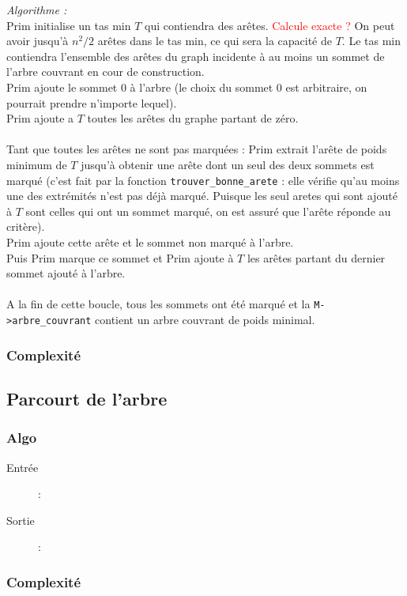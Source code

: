 \documentclass[a4paper,11pt]{article}
\begin{document}
\textit{Algorithme : } \\
Prim initialise un tas min $T$ qui contiendra des arêtes. \textcolor{red}{Calcule exacte ?} On peut avoir jusqu'à $n^2/2$ arêtes dans le tas min, ce qui sera la capacité de $T$. Le tas min contiendra l'ensemble des arêtes du graph incidente à au moins un sommet de l'arbre couvrant en cour de construction.\\
Prim ajoute le sommet 0 à l'arbre (le choix du sommet 0 est arbitraire, on pourrait prendre n'importe lequel).\\
Prim ajoute a $T$ toutes les arêtes du graphe partant de zéro.\\
\\
Tant que toutes les arêtes ne sont pas marquées : 
Prim extrait l'arête de poids minimum de $T$ jusqu'à obtenir une arête dont un seul des deux sommets est marqué (c'est fait par la fonction \texttt{trouver\_bonne\_arete} : elle vérifie qu'au moins une des extrémités n'est pas déjà marqué. Puisque les seul aretes qui sont ajouté à $T$ sont celles qui ont un sommet marqué, on est assuré que l'arête réponde au critère).\\
Prim ajoute cette arête et le sommet non marqué à l'arbre.\\
Puis Prim marque ce sommet et Prim ajoute à $T$ les arêtes partant du dernier sommet ajouté à l'arbre.\\
\\
A la fin de cette boucle, tous les sommets ont été marqué et la \texttt{M->arbre\_couvrant} contient un arbre couvrant de poids minimal.\\

\subsubsection*{Complexité}

\subsection{Parcourt de l'arbre} %
\subsubsection*{Algo}
\begin{description}
\item[Entrée] : 
\item[Sortie] : 
\end{description}
\subsubsection*{Complexité}
\end{document}
